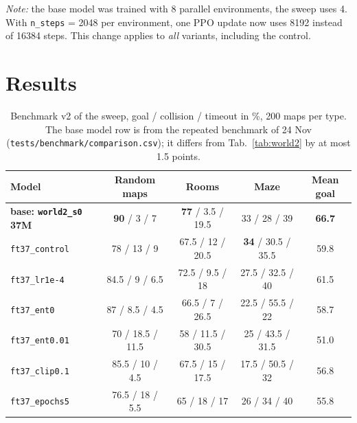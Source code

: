 \documentclass[11pt,a4paper]{article}
\newcommand{\code}[1]{\texttt{#1}}
\begin{document}
\emph{Note:} the base model was trained with 8 parallel environments, the sweep
uses 4. With \code{n\_steps} = 2048 per
environment, one PPO update now uses 8192 instead of 16384 steps. This change
applies to \emph{all} variants, including the control.

\section{Results}

\begin{table}[H]
      \centering\small
      \begin{tabular}{@{}l c c c c@{}}
            \toprule
            Model                                       & Random maps        & Rooms              & Maze               & Mean goal \\
            \midrule
            \textbf{base: \code{world2\_s0} 37M}        & \textbf{90} / 3 / 7      & \textbf{77} / 3.5 / 19.5 & 33 / 28 / 39       & \textbf{66.7} \\
            \midrule
            \code{ft37\_control}                        & 78 / 13 / 9        & 67.5 / 12 / 20.5   & \textbf{34} / 30.5 / 35.5 & 59.8 \\
            \code{ft37\_lr1e-4}                         & 84.5 / 9 / 6.5     & 72.5 / 9.5 / 18    & 27.5 / 32.5 / 40   & 61.5      \\
            \code{ft37\_ent0}                           & 87 / 8.5 / 4.5     & 66.5 / 7 / 26.5    & 22.5 / 55.5 / 22   & 58.7      \\
            \code{ft37\_ent0.01}                        & 70 / 18.5 / 11.5   & 58 / 11.5 / 30.5   & 25 / 43.5 / 31.5   & 51.0      \\
            \code{ft37\_clip0.1}                        & 85.5 / 10 / 4.5    & 67.5 / 15 / 17.5   & 17.5 / 50.5 / 32   & 56.8      \\
            \code{ft37\_epochs5}                        & 76.5 / 18 / 5.5    & 65 / 18 / 17       & 26 / 34 / 40       & 55.8      \\
            \bottomrule
      \end{tabular}
      \caption{Benchmark v2 of the sweep, goal / collision / timeout in \%,
            200 maps per type. The base model row is from the repeated benchmark of
            24 Nov (\code{tests/benchmark/comparison.csv}); it differs from
            Tab.~\ref{tab:world2} by at most 1.5 points.}
      \label{tab:ftresults}
\end{table}
\end{document}
